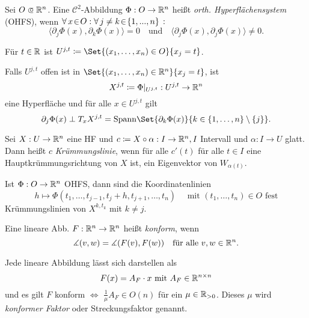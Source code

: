\documentclass{cheat-sheet}
\newcommand{\Cont}{\mathcal{C}} %
\begin{document}
\begin{defn}
  Sei $O \opn \R^n$. Eine $\Cont^2$-Abbildung $\Phi : O \to \mathbb{R}^n$ heißt \emph{orth. Hyperflächensystem} (OHFS), wenn $\forall \, {x \!\in\! O\!} \,:\, \! \forall \, {j \not= k \!\in\! \{ 1, ..., n \}} \,:\,\!$
  \[
    \langle \partial_j \Phi(x), \partial_k \Phi(x) \rangle = 0
    \quad \text{und} \quad
    \langle \partial_j \Phi(x), \partial_j \Phi(x) \rangle \not= 0.
  \]
\end{defn}

\begin{nota}
  Für $t \in \mathbb{R}$ ist $U^{j,t} \coloneqq \Set{ (x_1, \ldots, x_n) \in O }{ x_j = t }$.
\end{nota}

\begin{bem}
  Falls $U^{j,t}$ offen ist in $\Set{ (x_1, \ldots, x_n) \in \R^n }{ x_j = t }$, ist
  \[ X^{j,t} \coloneqq \Phi|_{U^{j,t}} : U^{j,t} \to \mathbb{R}^n \]
  eine Hyperfläche und für alle $x \in U^{j,t}$ gilt
  \[ \partial_j \Phi(x) \perp T_x X^{j,t} = \mathrm{Spann} \Set{ \partial_k \Phi(x) }{ k \in \{ 1, \ldots, n \} \setminus \{ j \} }. \]
\end{bem}

\begin{defn}
  Sei $X : U \to \mathbb{R}^n$ eine HF und $c \coloneqq X \circ \alpha : I \to \mathbb{R}^n, I$ Intervall und $\alpha : I \to U$ glatt. Dann heißt $c$ \emph{Krümmungslinie}, wenn für alle $c'(t)$ für alle $t \in I$ eine Hauptkrümmungsrichtung von $X$ ist, \dh{} ein Eigenvektor von $W_{\alpha(t)}$.
\end{defn}


\begin{satz}
  Ist $\Phi : O \to \mathbb{R}^n$ OHFS, dann sind die Koordinatenlinien
  \[ h \mapsto \Phi(t_1, \ldots, t_{j-1}, t_j + h, t_{j+1}, \ldots, t_n) \quad \text{ mit } (t_1, \ldots, t_n) \in O \text{ fest} \]
  Krümmungslinien von $X^{k, t_k}$ mit $k \not= j$.
\end{satz}

\begin{defn}
  Eine lineare Abb. $F : \mathbb{R}^n \to \mathbb{R}^n$ heißt \emph{konform}, wenn
  \[ \measuredangle (v, w) = \measuredangle (F(v), F(w)) \quad \text{für alle } v, w \in \mathbb{R}^n. \]
\end{defn}

\begin{bem}
  Jede lineare Abbildung lässt sich darstellen als
  \[ F(x) = A_F \cdot x \text{ mit } A_F \in \mathbb{R}^{n \times n} \]
  und es gilt $F$ konform $\iff$ $\tfrac{1}{\mu} A_F \in O(n)$ für ein $\mu \in \mathbb{R}_{> 0}$. Dieses $\mu$ wird \emph{konformer Faktor} oder Streckungsfaktor genannt.
\end{bem}
\end{document}
